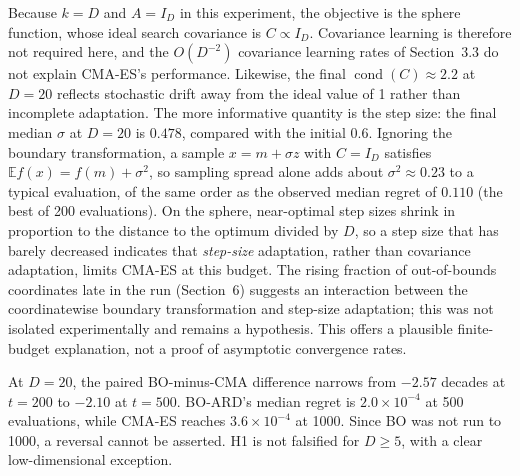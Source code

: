 \documentclass[11pt,a4paper]{article}
\newcommand{\E}{\mathbb{E}}
\begin{document}
Because $k=D$ and $A=I_D$ in this experiment, the objective is the sphere function, whose ideal search covariance is $C\propto I_D$. Covariance learning is therefore not required here, and the $O(D^{-2})$ covariance learning rates of Section~3.3 do not explain CMA-ES's performance. Likewise, the final $\operatorname{cond}(C)\approx2.2$ at $D=20$ reflects stochastic drift away from the ideal value of 1 rather than incomplete adaptation. The more informative quantity is the step size: the final median $\sigma$ at $D=20$ is $0.478$, compared with the initial $0.6$. Ignoring the boundary transformation, a sample $x=m+\sigma z$ with $C=I_D$ satisfies $\E f(x)=f(m)+\sigma^2$, so sampling spread alone adds about $\sigma^2\approx0.23$ to a typical evaluation, of the same order as the observed median regret of $0.110$ (the best of 200 evaluations). On the sphere, near-optimal step sizes shrink in proportion to the distance to the optimum divided by $D$, so a step size that has barely decreased indicates that \emph{step-size} adaptation, rather than covariance adaptation, limits CMA-ES at this budget. The rising fraction of out-of-bounds coordinates late in the run (Section~6) suggests an interaction between the coordinatewise boundary transformation and step-size adaptation; this was not isolated experimentally and remains a hypothesis. This offers a plausible finite-budget explanation, not a proof of asymptotic convergence rates.

At $D=20$, the paired BO-minus-CMA difference narrows from $-2.57$ decades at $t=200$ to $-2.10$ at $t=500$. BO-ARD's median regret is $2.0\times10^{-4}$ at 500 evaluations, while CMA-ES reaches $3.6\times10^{-4}$ at 1000. Since BO was not run to 1000, a reversal cannot be asserted. H1 is not falsified for $D\ge5$, with a clear low-dimensional exception.
\end{document}
